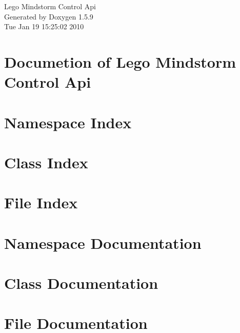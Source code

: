\documentclass[a4paper]{book}
\begin{document}
\begin{titlepage}
\vspace*{7cm}
\begin{center}
{\Large Lego Mindstorm Control Api }\\
\vspace*{1cm}
{\large Generated by Doxygen 1.5.9}\\
\vspace*{0.5cm}
{\small Tue Jan 19 15:25:02 2010}\\
\end{center}
\end{titlepage}
\clearemptydoublepage
{}
\tableofcontents
\clearemptydoublepage
{}
\chapter{Documetion of Lego Mindstorm Control Api}
\label{index}
\chapter{Namespace Index}

\chapter{Class Index}

\chapter{File Index}

\chapter{Namespace Documentation}

\chapter{Class Documentation}








\chapter{File Documentation}



\printindex
\end{document}
